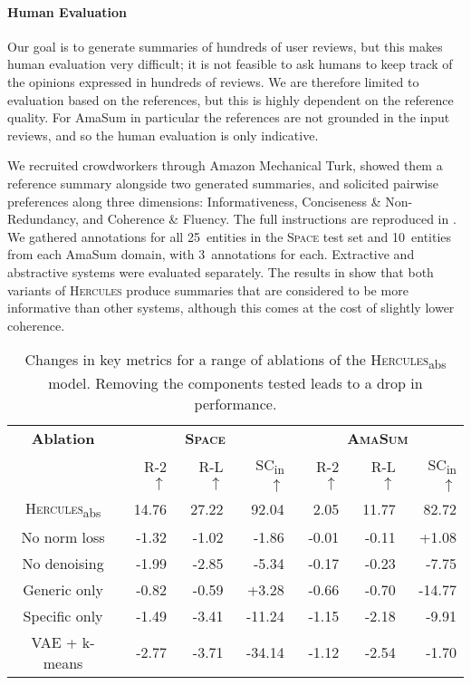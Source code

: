 \documentclass[11pt]{article}
\begin{document}
\paragraph{Human Evaluation}



Our goal is to generate summaries of hundreds of user reviews, but this makes human evaluation very difficult; it is not feasible to ask humans to keep track of the opinions expressed in hundreds of reviews. We are therefore limited to evaluation based on the references, but this is highly dependent on the reference quality. For AmaSum in particular the references are not grounded in the input reviews, and so the human evaluation is only indicative.

We recruited crowdworkers through Amazon Mechanical Turk, showed them a reference summary alongside two generated summaries, and solicited pairwise preferences along three dimensions: Informativeness, Conciseness \& Non-Redundancy, and Coherence \& Fluency. The full instructions are reproduced in . We gathered annotations for all 25~entities in the \textsc{Space} test set and 10~entities from each AmaSum domain, with 3~annotations for each. Extractive and abstractive systems were evaluated separately. The results in  show that both variants of \textsc{Hercules} produce summaries that are considered to be more informative than other systems, although this comes at the cost of slightly lower coherence.




\begin{table}[t]
    \centering
    \small
    \begin{tabular}{@{~}c@{~}||@{~}r@{~}r@{~}r@{~}|@{~}r@{~}r@{~}r@{~}}
    \textbf{Ablation} & \multicolumn{3}{c}{\textsc{\textbf{Space}}} & \multicolumn{3}{c}{\textsc{\textbf{AmaSum}}} \\
     & R-2 $\uparrow$ & R-L $\uparrow$ & SC\textsubscript{in} $\uparrow$ & R-2 $\uparrow$ & R-L $\uparrow$ & SC\textsubscript{in} $\uparrow$ \\
    \hline\hline
        \textsc{Hercules}\textsubscript{abs} & {14.76} & {27.22} & 92.04 & {2.05} & {11.77} & 82.72   \\
        \hline
No norm loss & -1.32 & -1.02 & -1.86 & -0.01 & -0.11 & +1.08 \\
        No denoising & -1.99 & -2.85 & -5.34 & -0.17 & -0.23 & -7.75  \\
Generic only & -0.82 & -0.59 & +3.28 & -0.66 & -0.70 & -14.77 \\
        Specific only & -1.49 & -3.41 & -11.24 & -1.15 & -2.18 & -9.91 \\
        VAE + k-means & -2.77 & -3.71 & -34.14 & -1.12 & -2.54 & -1.70  \\
\end{tabular}
    \vspace{-0.1cm}
    \caption{Changes in key metrics for a range of ablations of the \textsc{Hercules}\textsubscript{abs} model. Removing the components tested leads to a drop in performance.}
    \vspace{-0.2cm}
    \label{tab:ablations}
\end{table}
\end{document}
